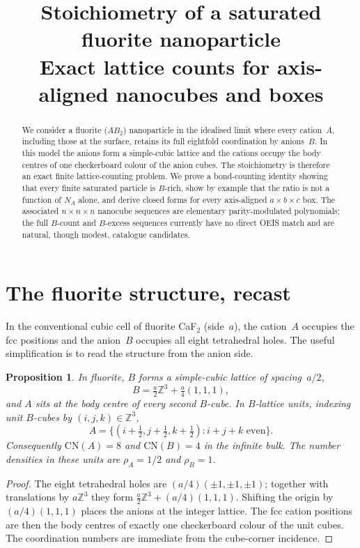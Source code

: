 \documentclass[11pt]{article}
\title{Stoichiometry of a saturated fluorite nanoparticle\\[2pt]
\large Exact lattice counts for axis-aligned nanocubes and boxes}
\author{}
\date{}
\theoremstyle{plain}
\newtheorem{proposition}[theorem]{Proposition}
\theoremstyle{definition}
\theoremstyle{remark}
\newcommand{\Z}{\mathbb{Z}}
\newcommand{\NA}{N_{\!A}}
\begin{document}
\maketitle

\begin{abstract}
We consider a fluorite ($AB_2$) nanoparticle in the idealised limit where every
cation~$A$, including those at the surface, retains its full eightfold
coordination by anions~$B$.  In this model the anions form a simple-cubic
lattice and the cations occupy the body centres of one checkerboard colour of
the anion cubes.  The stoichiometry is therefore an exact finite
lattice-counting problem.  We prove a bond-counting identity showing that every
finite saturated particle is $B$-rich, show by example that the ratio is not a
function of $\NA$ alone, and derive closed forms for every axis-aligned
$a\times b\times c$ box.  The associated $n\times n\times n$ nanocube sequences
are elementary parity-modulated polynomials; the full $B$-count and $B$-excess
sequences currently have no direct OEIS match and are natural, though modest,
catalogue candidates.
\end{abstract}

\section{The fluorite structure, recast}

In the conventional cubic cell of fluorite CaF$_2$ (side~$a$), the cation~$A$
occupies the fcc positions and the anion~$B$ occupies all eight tetrahedral
holes.  The useful simplification is to read the structure from the anion side.

\begin{proposition}\label{prop:recast}
In fluorite, $B$ forms a simple-cubic lattice of spacing~$a/2$,
\[
B = \tfrac{a}{2}\Z^3 + \tfrac{a}{4}(1,1,1),
\]
and $A$ sits at the body centre of every second $B$-cube.  In $B$-lattice units,
indexing unit $B$-cubes by $(i,j,k)\in\Z^3$,
\[
A = \{(i+\tfrac12,j+\tfrac12,k+\tfrac12): i+j+k\text{ even}\}.
\]
Consequently $\mathrm{CN}(A)=8$ and $\mathrm{CN}(B)=4$ in the infinite bulk.
The number densities in these units are $\rho_A=1/2$ and $\rho_B=1$.
\end{proposition}

\begin{proof}
The eight tetrahedral holes are $(a/4)(\pm1,\pm1,\pm1)$; together with
translations by $a\Z^3$ they form $\tfrac{a}{2}\Z^3+(a/4)(1,1,1)$.  Shifting
the origin by $(a/4)(1,1,1)$ places the anions at the integer lattice.  The fcc
cation positions are then the body centres of exactly one checkerboard colour
of the unit cubes.  The coordination numbers are immediate from the cube-corner
incidence.
\end{proof}
\end{document}
